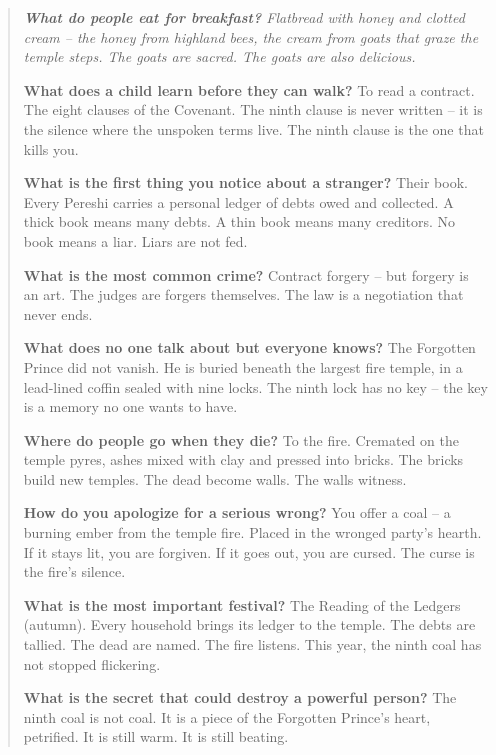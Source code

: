 \documentclass[12pt,oneside]{book}
\newenvironment{almanac}
  {\begin{quote}\small\itshape}
  {\end{quote}}
\begin{document}
\vspace{1em}
\begin{almanac}
\textbf{What do people eat for breakfast?} Flatbread with honey and clotted cream -- the honey from highland bees, the cream from goats that graze the temple steps. The goats are sacred. The goats are also delicious.

\textbf{What does a child learn before they can walk?} To read a contract. The eight clauses of the Covenant. The ninth clause is never written -- it is the silence where the unspoken terms live. The ninth clause is the one that kills you.

\textbf{What is the first thing you notice about a stranger?} Their book. Every Pereshi carries a personal ledger of debts owed and collected. A thick book means many debts. A thin book means many creditors. No book means a liar. Liars are not fed.

\textbf{What is the most common crime?} Contract forgery -- but forgery is an art. The judges are forgers themselves. The law is a negotiation that never ends.

\textbf{What does no one talk about but everyone knows?} The Forgotten Prince did not vanish. He is buried beneath the largest fire temple, in a lead-lined coffin sealed with nine locks. The ninth lock has no key -- the key is a memory no one wants to have.

\textbf{Where do people go when they die?} To the fire. Cremated on the temple pyres, ashes mixed with clay and pressed into bricks. The bricks build new temples. The dead become walls. The walls witness.

\textbf{How do you apologize for a serious wrong?} You offer a coal -- a burning ember from the temple fire. Placed in the wronged party's hearth. If it stays lit, you are forgiven. If it goes out, you are cursed. The curse is the fire's silence.

\textbf{What is the most important festival?} The Reading of the Ledgers (autumn). Every household brings its ledger to the temple. The debts are tallied. The dead are named. The fire listens. This year, the ninth coal has not stopped flickering.

\textbf{What is the secret that could destroy a powerful person?} The ninth coal is not coal. It is a piece of the Forgotten Prince's heart, petrified. It is still warm. It is still beating.
\end{almanac}
\end{document}
